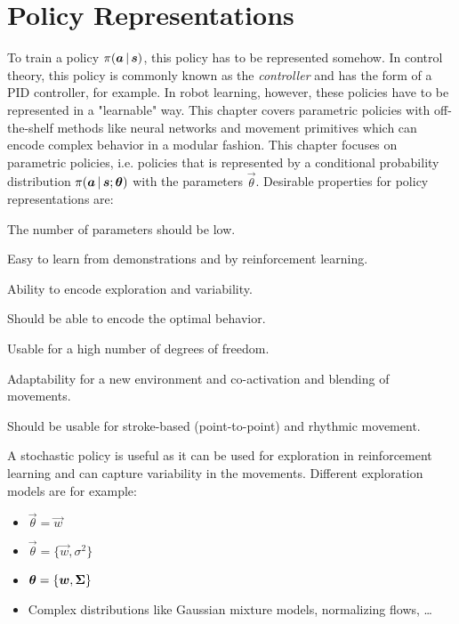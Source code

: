 \chapter{Policy Representations}
	To train a policy \( \pi(\bm{a} \,\vert\, \bm{s}) \), this policy has to be represented somehow. In control theory, this policy is commonly known as the \emph{controller} and has the form of a PID controller, for example. In robot learning, however, these policies have to be represented in a "learnable" way. This chapter covers parametric policies with off-the-shelf methods like neural networks and movement primitives which can encode complex behavior in a modular fashion. This chapter focuses on parametric policies, i.e. policies that is represented by a conditional probability distribution \( \pi(\bm{a} \,\vert\, \bm{s}; \bm{\theta}) \) with the parameters \(\vec{\theta}\). Desirable properties for policy representations are:
	\begin{description}[leftmargin=3.5cm]
		\item[Compactness]   The number of parameters should be low.
		\item[Learnability]  Easy to learn from demonstrations and by reinforcement learning.
		\item[Stochasticity] Ability to encode exploration and variability.
		\item[Optimality]    Should be able to encode the optimal behavior.
		\item[Scalability]   Usable for a high number of degrees of freedom.
		\item[Modularity]    Adaptability for a new environment and co-activation and blending of movements.
		\item[Usability]     Should be usable for stroke-based (point-to-point) and rhythmic movement.
	\end{description}
	A stochastic policy is useful as it can be used for exploration in reinforcement learning and can capture variability in the movements. Different exploration models are for example:
	\begin{itemize}
		\item {}       \quad \( \vec{\theta} = \vec{w} \)
		\item {}         \quad \( \vec{\theta} = \{ \vec{w}, \sigma^2 \} \)
		\item {}           \quad \( \bm{\theta} = \{ \bm{w}, \bm{\Sigma} \} \)
		\item Complex distributions like Gaussian mixture models, normalizing flows, \dots
	\end{itemize}

